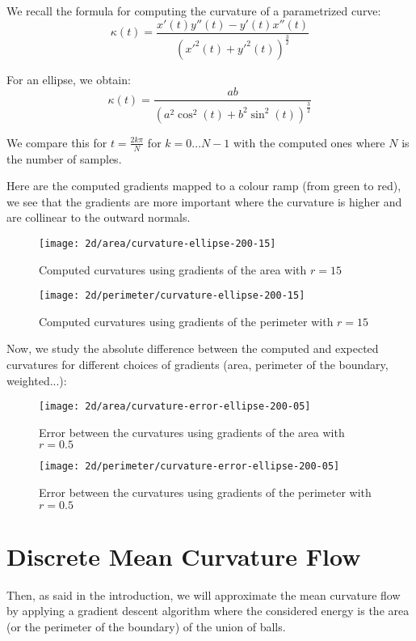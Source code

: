 We recall the formula for computing the curvature of a parametrized curve:
$$ \kappa(t) = \frac{x'(t) y''(t) - y'(t) x''(t)}{(x'^2(t) +
    y'^2(t))^{\frac{3}{2}} } $$

For an ellipse, we obtain:
$$ \kappa(t) = \frac{ab}{(a^2 \cos^2(t) + b^2 \sin^2(t))^{\frac{3}{2}} } $$

We compare this for $ t = \frac{2 k \pi}{N} $ for $ k = 0 \ldots N - 1 $ with
the computed ones where $ N $ is the number of samples.

Here are the computed gradients mapped to a colour ramp (from green to red), we see
that the gradients are more important where the curvature is higher and are
collinear to the outward normals.

\begin{figure}[H]
    \centering

    \texttt{[image: 2d/area/curvature-ellipse-200-15]}
    \caption{Computed curvatures using gradients of the area with $ r = 15 $}

    \texttt{[image: 2d/perimeter/curvature-ellipse-200-15]}
    \caption{Computed curvatures using gradients of the perimeter with $ r = 15 $}
\end{figure}


Now, we study the absolute difference between the computed and expected
curvatures for different choices of gradients (area, perimeter of the boundary,
weighted...):

\begin{figure}[H]
    \centering

    \texttt{[image: 2d/area/curvature-error-ellipse-200-05]}
    \caption{Error between the curvatures using gradients of the area with $ r = 0.5 $}

    \texttt{[image: 2d/perimeter/curvature-error-ellipse-200-05]}
    \caption{Error between the curvatures using gradients of the perimeter with $ r = 0.5 $}
\end{figure}

\section{Discrete Mean Curvature Flow}

Then, as said in the introduction, we will approximate the mean curvature flow
by applying a gradient descent algorithm where the considered energy is the area
(or the perimeter of the boundary) of the union of balls.

